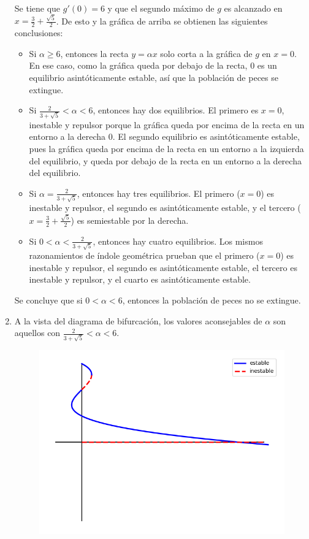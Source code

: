\documentclass[11pt]{report}
\begin{document}
\begin{solution}
\begin{enumerate}
\begin{figure}[H]
        \end{figure}
        Se tiene que $g'(0) = 6$ y que el segundo máximo de $g$ es alcanzado en $x = \frac{3}{2}+\frac{\sqrt{5}}{2}$. De esto y la gráfica de arriba se obtienen las siguientes conclusiones:
        \begin{itemize}
            \item Si $\alpha \geq 6$, entonces la recta $y = \alpha x$ solo corta a la gráfica de $g$ en $x = 0$. En ese caso, como la gráfica queda por debajo de la recta, $0$ es un equilibrio asintóticamente estable, así que la población de peces se extingue.
            \item Si $\frac{2}{3+\sqrt{5}} <  \alpha < 6$, entonces hay dos equilibrios. El primero es $x = 0$, inestable y repulsor porque la gráfica queda por encima de la recta en un entorno a la derecha $0$. El segundo equilibrio es asintóticamente estable, pues la gráfica queda por encima de la recta en un entorno a la izquierda del equilibrio, y queda por debajo de la recta en un entorno a la derecha del equilibrio.
            \item Si $\alpha = \frac{2}{3+\sqrt{5}}$, entonces hay tres equilibrios. El primero ($x = 0$) es inestable y repulsor, el segundo es asintóticamente estable, y el tercero ($x = \frac{3}{2}+\frac{\sqrt{5}}{2}$) es semiestable por la derecha.
            \item Si $0<\alpha < \frac{2}{3+\sqrt{5}}$, entonces hay cuatro equilibrios. Los mismos razonamientos de índole geométrica prueban que el primero ($x=0$) es inestable y repulsor, el segundo es asintóticamente estable, el tercero es inestable y repulsor, y el cuarto es asintóticamente estable.
        \end{itemize}
        Se concluye que si $0 < \alpha < 6$, entonces la población de peces no se extingue.
        \item A la vista del diagrama de bifurcación, los valores aconsejables de $\alpha$ son aquellos con $\frac{2}{3+\sqrt{5}} < \alpha <6$.
        \begin{figure}[H]
            \centering
            \includegraphics[scale = 0.5]{img/15.png}
        \end{figure}
    \end{enumerate}
\end{solution}
\end{document}

